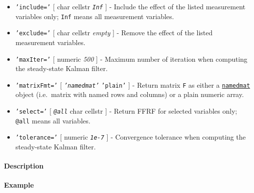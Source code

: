 \begin{itemize}
\item
  \texttt{'include='} {[} char \textbar{} cellstr \textbar{}
  \emph{\texttt{Inf}} {]} - Include the effect of the listed measurement
  variables only; \texttt{Inf} means all measurement variables.
\item
  \texttt{'exclude='} {[} char \textbar{} cellstr \textbar{}
  \emph{empty} {]} - Remove the effect of the listed measurement
  variables.
\item
  \texttt{'maxIter='} {[} numeric \textbar{} \emph{500} {]} - Maximum
  number of iteration when computing the steady-state Kalman filter.
\item
  \texttt{'matrixFmt='} {[} \emph{\texttt{'namedmat'}} \textbar{}
  \texttt{'plain'} {]} - Return matrix \texttt{F} as either a
  \href{namedmat/Contents}{\texttt{namedmat}} object (i.e.~matrix with
  named rows and columns) or a plain numeric array.
\item
  \texttt{'select='} {[} \emph{\texttt{@all}} \textbar{} char \textbar{}
  cellstr {]} - Return FFRF for selected variables only; \texttt{@all}
  means all variables.
\item
  \texttt{'tolerance='} {[} numeric \textbar{} \emph{\texttt{1e-7}} {]}
  - Convergence tolerance when computing the steady-state Kalman filter.
\end{itemize}

\paragraph{Description}\label{description}

\paragraph{Example}\label{example}



